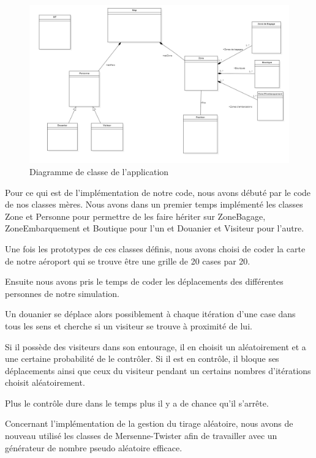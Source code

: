 \documentclass[12pt,french]{article} %
\begin{document}
\begin{figure}[H]
	\centering
	\includegraphics[scale=0.4]{analyse.png}
	\caption{Diagramme de classe de l'application}    
\end{figure}



Pour ce qui est de l'implémentation de notre code, nous avons débuté par le code de nos classes mères. Nous avons dans un premier temps implémenté les classes Zone et Personne pour permettre de les faire hériter sur ZoneBagage, ZoneEmbarquement et Boutique pour l'un et Douanier et Visiteur pour l'autre. 

\medskip

Une fois les prototypes de ces classes définis, nous avons choisi de coder la carte de notre aéroport qui se trouve être une grille de 20 cases par 20. 

\medskip

Ensuite nous avons pris le temps de coder les déplacements des différentes personnes de notre simulation. 

Un douanier se déplace alors possiblement à chaque itération d'une case dans tous les sens et cherche si un visiteur se trouve à proximité de lui. 

Si il possède des visiteurs dans son entourage, il en choisit un aléatoirement et a une certaine probabilité de le contrôler. Si il est en contrôle, il bloque ses déplacements ainsi que ceux du visiteur pendant un certains nombres d'itérations choisit aléatoirement. 

Plus le contrôle dure dans le temps plus il y a de chance qu'il s'arrête.

\bigskip

Concernant l'implémentation de la gestion du tirage aléatoire, nous avons de nouveau utilisé les classes de Mersenne-Twister afin de travailler avec un générateur de nombre pseudo aléatoire efficace.
\newline
\end{document}
